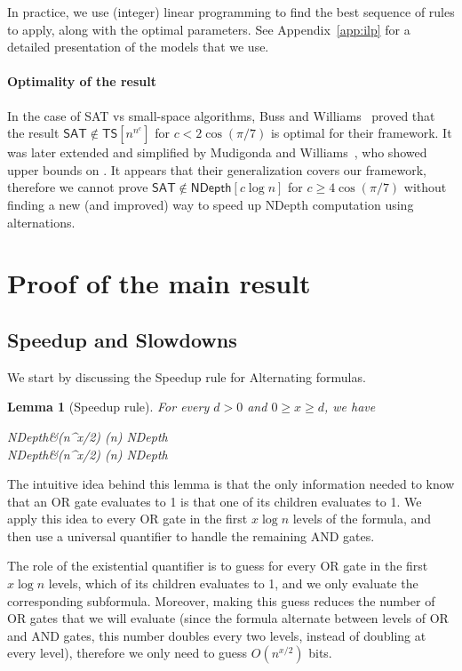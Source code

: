\documentclass[a4paper, 11pt]{article}
\theoremstyle{plain}
\newtheorem{lemma}[theorem]{Lemma}
\theoremstyle{definition}
\theoremstyle{remark}
\newcommand{\SAT}{\textsf{SAT}}%
\newcommand{\ND}{\textsf{NDepth}}%
\newcommand{\NDL}[1]{\ND\left[ #1 \log n\right]}%
\newcommand{\TS}[1]{\textsf{TS}\left[ n^{ #1 }\right]}%
\begin{document}
In practice, we use (integer) linear programming to find the
best sequence of rules to apply, along with the optimal parameters.
See Appendix~\ref{app:ilp} for a detailed presentation of the models that we use.

\paragraph{Optimality of the result}
In the case of \SAT{} vs small-space algorithms, 
Buss and Williams~\cite{buss2015limits} proved that the result $\SAT\notin \TS{n^c}$
for $c < 2\cos(\pi/7)$ is optimal for their framework. 
It was later extended and simplified by Mudigonda and Williams~\cite{mudigonda2020time},
who showed upper bounds on .
It appears that their generalization covers our framework,
therefore we cannot prove $\SAT\notin\NDL{c}$ for $c \ge 4\cos(\pi/7)$
without finding a new (and improved) way to speed up \ND{} computation using alternations.

\section{Proof of the main result}

\subsection{Speedup and Slowdowns}\label{sec:rules}
We start by discussing the Speedup rule for Alternating formulas.

\begin{lemma}[Speedup rule]\label{lemma:speedup}
	For every $d > 0$ and $0 \ge x \ge d$, we have
	\begin{flalign*}
	\NDL{d} &\subseteq (\exists n^{x/2}) (\forall n) \NDL{d-x}\\
	\NDL{d} &\subseteq (\forall n^{x/2}) (\exists n) \NDL{d-x}
	\end{flalign*}
\end{lemma}

The intuitive idea behind this lemma is that the only
information needed to know that an OR gate evaluates
to 1 is that one of its children evaluates to 1. 
We apply this idea to every OR gate in the first $x \log n$
levels of the formula,
and then use a universal quantifier to handle the remaining AND gates.

The role of the existential quantifier is to guess for every OR gate in the first $x\log n$ levels,
which of its children evaluates to 1, and we only evaluate the corresponding subformula.
Moreover, making this guess reduces the number of OR gates that we will evaluate
(since the formula alternate between levels of OR and AND gates, this number doubles every two levels,
instead of doubling at every level), 
therefore we only need to guess $O(n^{x/2})$ bits. 
\end{document}
